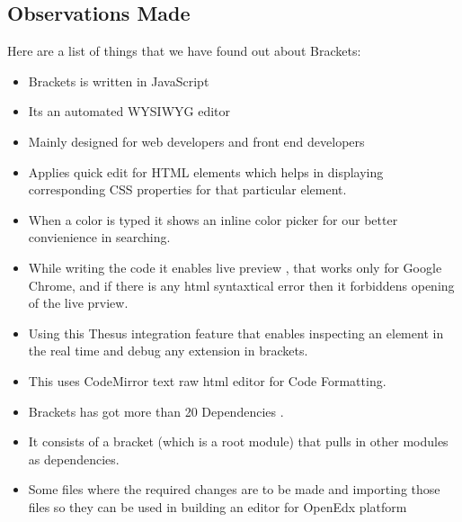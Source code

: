 \subsection{Observations Made}
Here are a list of things that we have found out about Brackets: \newline
\begin{itemize}
\item Brackets is written in JavaScript
\item Its an automated WYSIWYG editor
\item Mainly designed for web developers and front end developers
\item Applies quick edit for HTML elements which helps in displaying corresponding CSS
properties for that particular element.
\item When a color is typed it shows an inline color picker for our better convienience in
searching.
\item While writing the code it enables live preview , that works only for Google Chrome, and if
there is any html syntaxtical error then it forbiddens opening of the live prview.
\item Using this Thesus integration feature that enables inspecting an element in the real time and
debug any extension in brackets.
\item This uses CodeMirror text raw html editor for Code Formatting.
\item Brackets has got more than 20 Dependencies .
\item It consists of a bracket (which is a root module) that pulls in other modules as dependencies.
\item Some files where the required changes are to be made and importing those files so they can
be used in building an editor for OpenEdx platform
\end{itemize}

